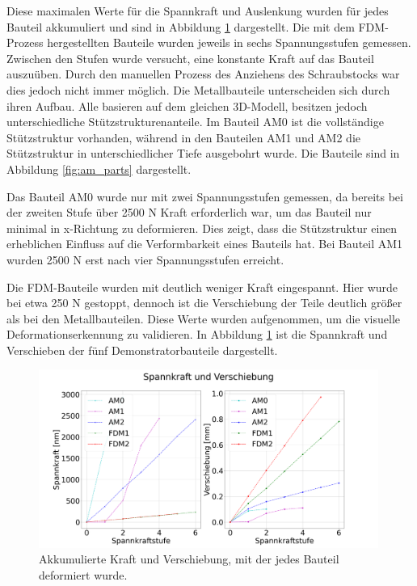 Diese maximalen Werte für die Spannkraft und Auslenkung wurden für jedes Bauteil 
akkumuliert und sind in Abbildung \ref{fig:akkumulated} dargestellt. 
Die mit dem FDM-Prozess hergestellten Bauteile wurden jeweils in sechs Spannungsstufen
gemessen. Zwischen den Stufen wurde versucht, eine konstante Kraft auf das Bauteil 
auszuüben. Durch den manuellen Prozess des Anziehens des Schraubstocks war dies 
jedoch nicht immer möglich.
Die Metallbauteile unterscheiden sich durch ihren Aufbau. 
Alle basieren auf dem gleichen 3D-Modell, besitzen jedoch unterschiedliche 
Stützstrukturenanteile. Im Bauteil AM0 ist die vollständige Stützstruktur vorhanden,
während in den Bauteilen AM1 und AM2 die Stützstruktur in unterschiedlicher 
Tiefe ausgebohrt wurde. Die Bauteile sind in Abbildung \ref{fig:am_parts} dargestellt.

Das Bauteil AM0 wurde nur mit zwei Spannungsstufen gemessen, 
da bereits bei der zweiten Stufe über 2500 N Kraft erforderlich war, 
um das Bauteil nur minimal in x-Richtung zu deformieren. Dies zeigt, 
dass die Stützstruktur einen erheblichen Einfluss auf die Verformbarkeit 
eines Bauteils hat. Bei Bauteil AM1 wurden 2500 N erst nach vier Spannungsstufen 
erreicht.

Die FDM-Bauteile wurden mit deutlich weniger Kraft eingespannt. 
Hier wurde bei etwa 250 N gestoppt, dennoch ist die Verschiebung der 
Teile deutlich größer als bei den Metallbauteilen. Diese Werte wurden aufgenommen, 
um die visuelle Deformationserkennung zu validieren. In Abbildung \ref{fig:akkumulated} 
ist die Spannkraft und Verschieben der fünf Demonstratorbauteile dargestellt.

\begin{figure}[H]
    \centering
    \includegraphics[width=0.99\textwidth]{images/spannkraftstufen_akkumuliert.png}
    \caption{Akkumulierte Kraft und Verschiebung, mit der jedes Bauteil deformiert wurde.}
    \label{fig:akkumulated}
\end{figure}

